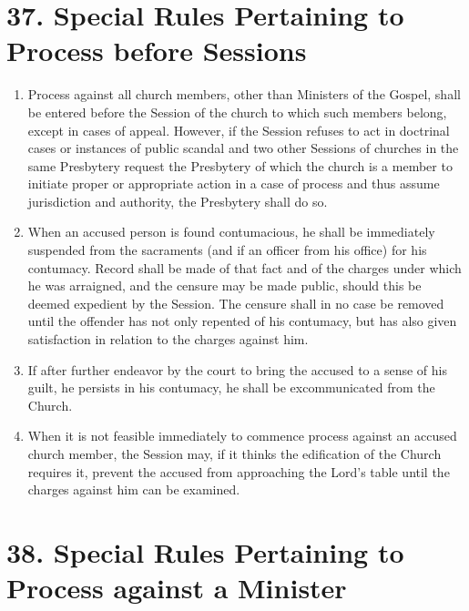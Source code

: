 \documentclass[
]{book}
\providecommand{\tightlist}{%
  \setlength{\itemsep}{0pt}\setlength{\parskip}{0pt}}
\begin{document}
\hypertarget{special-rules-pertaining-to-process-before-sessions}{%
\section*{37. Special Rules Pertaining to Process before Sessions}\label{special-rules-pertaining-to-process-before-sessions}}

\protect\hypertarget{chapter-slug-37-special-rules-pertaining-to-process-before-sessions}{\href{}{}}

\begin{enumerate}
\def\labelenumi{\arabic{enumi}.}
\tightlist
\item
  \protect\hypertarget{37}{\href{}{}}Process against all church members, other than Ministers of the Gospel, shall be entered before the Session of the church to which such members belong, except in cases of appeal. However, if the Session refuses to act in doctrinal cases or instances of public scandal and two other Sessions of churches in the same Presbytery request the Presbytery of which the church is a member to initiate proper or appropriate action in a case of process and thus assume jurisdiction and authority, the Presbytery shall do so.
\item
  \protect\hypertarget{37.2}{\href{}{}}When an accused person is found contumacious, he shall be immediately suspended from the sacraments (and if an officer from his office) for his contumacy. Record shall be made of that fact and of the charges under which he was arraigned, and the censure may be made public, should this be deemed expedient by the Session. The censure shall in no case be removed until the offender has not only repented of his contumacy, but has also given satisfaction in relation to the charges against him.
\item
  \protect\hypertarget{37.3}{\href{}{}}If after further endeavor by the court to bring the accused to a sense of his guilt, he persists in his contumacy, he shall be excommunicated from the Church.
\item
  When it is not feasible immediately to commence process against an accused church member, the Session may, if it thinks the edification of the Church requires it, prevent the accused from approaching the Lord's table until the charges against him can be examined.
\end{enumerate}

\hypertarget{special-rules-pertaining-to-process-against-a-minister}{%
\section*{38. Special Rules Pertaining to Process against a Minister}\label{special-rules-pertaining-to-process-against-a-minister}}
\end{document}
